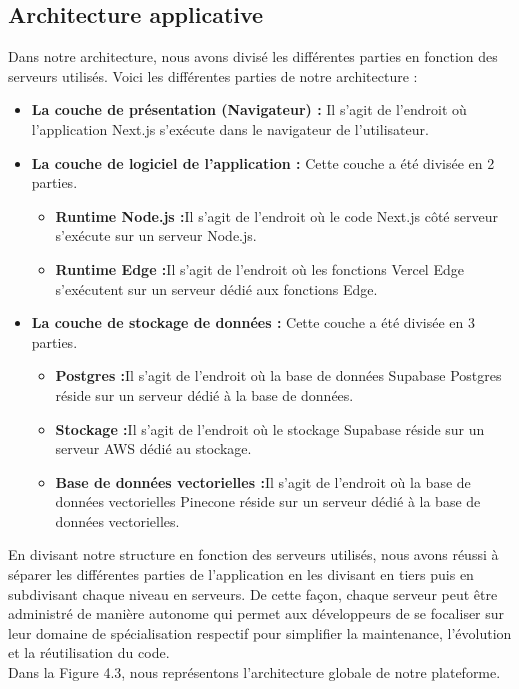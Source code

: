 \subsection{Architecture applicative}
Dans notre architecture, nous avons divisé les différentes parties en fonction des serveurs utilisés. Voici les différentes parties de notre architecture :
\begin{itemize}[itemsep=1pt, parsep=1pt]
    \item \textbf{La couche de présentation (Navigateur) : }Il s'agit de l'endroit où l'application Next.js s'exécute dans le navigateur de l'utilisateur.
    \item \textbf{La couche de logiciel de l'application : }Cette couche a été divisée en 2 parties.
        \begin{itemize}[itemsep=1pt, parsep=1pt]
            \item \textbf{Runtime Node.js :}Il s'agit de l'endroit où le code Next.js côté serveur s'exécute sur un serveur Node.js.
            \item \textbf{Runtime Edge :}Il s'agit de l'endroit où les fonctions Vercel Edge s'exécutent sur un serveur dédié aux fonctions Edge.
        \end{itemize}
    \item  \textbf{La couche de stockage de données : }Cette couche a été divisée en 3 parties.
    \begin{itemize}[itemsep=1pt, parsep=1pt]
        \item \textbf{Postgres :}Il s'agit de l'endroit où la base de données Supabase Postgres réside sur un serveur dédié à la base de données.
        \item \textbf{Stockage :}Il s'agit de l'endroit où le stockage Supabase réside sur un serveur AWS dédié au stockage.
        \item  \textbf{Base de données vectorielles :}Il s'agit de l'endroit où la base de données vectorielles Pinecone réside sur un serveur dédié à la base de données vectorielles.
    \end{itemize}
\end{itemize}
En divisant notre structure en fonction des serveurs utilisés, nous avons réussi à séparer les différentes parties de l'application en les divisant en tiers puis en subdivisant chaque niveau en serveurs. De cette façon, chaque serveur peut être administré de manière autonome qui permet aux développeurs de se focaliser sur leur domaine de spécialisation respectif pour simplifier la maintenance, l'évolution et la réutilisation du code.\\
Dans la Figure 4.3, nous représentons l’architecture globale de notre plateforme.

